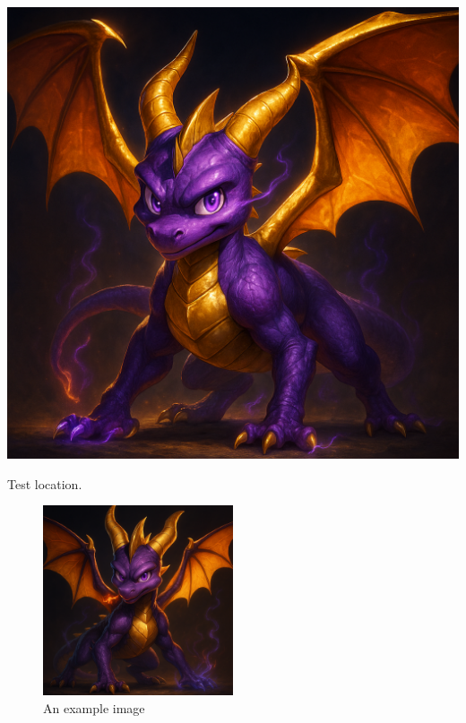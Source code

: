\documentclass{article}
\begin{document}
\begin{center}
\includegraphics[clip, trim = 0 0 50 50]{example-image.png}
\end{center}


\lipsum[1-4] %
Test location.
\begin{figure}[ht]
\centering
\includegraphics[width=0.5\textwidth]{example-image-a.png}
\caption{An example image}
\end{figure}
\lipsum[6-10] %

\end{document}
